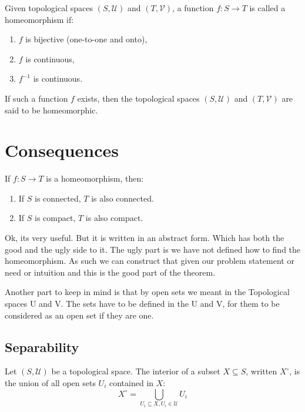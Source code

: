 \documentclass{article}
\begin{document}
\begin{theorem}
    Given topological spaces \((S, \mathcal{U})\) and \((T, \mathcal{V})\), a function \( f : S \to T \) is called a homeomorphism if:

\begin{enumerate}
    \item \( f \) is bijective (one-to-one and onto),
    \item \( f \) is continuous,
    \item \( f^{-1} \) is continuous.
\end{enumerate}

If such a function \( f \) exists, then the topological spaces \((S, \mathcal{U})\) and \((T, \mathcal{V})\) are said to be homeomorphic.

\section*{Consequences}

If \( f : S \to T \) is a homeomorphism, then:
\begin{enumerate}
    \item If \( S \) is connected, \( T \) is also connected.
    \item If \( S \) is compact, \( T \) is also compact.
\end{enumerate} 

\end{theorem}

Ok, its very useful. But it is written in an abstract form. Which has both the good and the ugly side to it. The ugly part is we have not defined how to find the homeomorphism. As such we can construct that given our problem statement or need or intuition and this is the good part of the theorem. 

Another part to keep in mind is that by open sets we meant in the Topological spaces U and V. The sets have to be defined in the U and V, for them to be considered as an open set if they are one. 

\subsection{Separability}

\begin{theorem}
    Let \((S, \mathcal{U})\) be a topological space.
    The interior of a subset \(X \subseteq S\), written \(X^\circ\), is the union of all open sets \(U_i\) contained in \(X\):
\[
X^\circ = \bigcup_{U_i \subseteq X, U_i \in \mathcal{U}} U_i
\]

\end{theorem}
\end{document}
